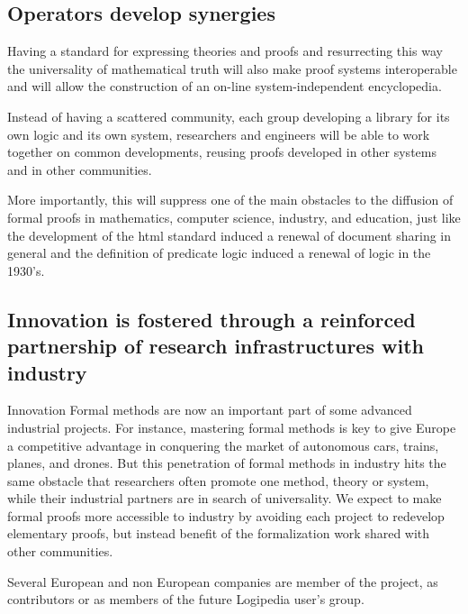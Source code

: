 \subsection{Operators develop synergies}

Having a standard for expressing theories and proofs and resurrecting
this way the universality of mathematical truth will also make proof
systems interoperable and will allow the construction of an on-line
system-independent encyclopedia.

Instead of having a scattered community, each group developing a
library for its own logic and its own system, researchers and
engineers will be able to work together on common developments,
reusing proofs developed in other systems and in other communities.

More importantly, this will suppress one of the main obstacles to the
diffusion of formal proofs in mathematics, computer science, industry,
and education, just like the development of the html standard induced
a renewal of document sharing in general and the definition of
predicate logic induced a renewal of logic in the 1930's.



\subsection{Innovation is fostered through a reinforced partnership of research
infrastructures with industry}

Innovation Formal methods are now an important part of some advanced
industrial projects. For instance, mastering formal methods is key to
give Europe a competitive advantage in conquering the market of
autonomous cars, trains, planes, and drones. But this penetration of
formal methods in industry hits the same obstacle that researchers
often promote one method, theory or system, while their industrial
partners are in search of universality. We expect to make formal
proofs more accessible to industry by avoiding each project to
redevelop elementary proofs, but instead benefit of the formalization
work shared with other communities.

Several European and non European companies are member of the project,
as contributors or as members of the future {\sc Logipedia} user's group.

